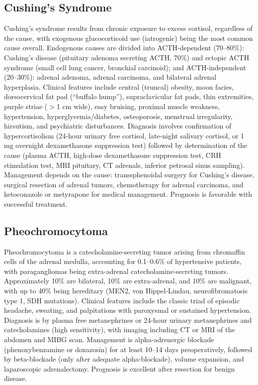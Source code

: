 \subsection{Cushing's Syndrome}
\label{sec:Cushing's Syndrome}
Cushing's syndrome results from chronic exposure to excess cortisol, regardless of the cause, with exogenous glucocorticoid use (iatrogenic) being the most common cause overall. Endogenous causes are divided into ACTH-dependent (70--80\%): Cushing's disease (pituitary adenoma secreting ACTH, 70\%) and ectopic ACTH syndrome (small cell lung cancer, bronchial carcinoid); and ACTH-independent (20--30\%): adrenal adenoma, adrenal carcinoma, and bilateral adrenal hyperplasia. Clinical features include central (truncal) obesity, moon facies, dorsocervical fat pad (``buffalo hump''), supraclavicular fat pads, thin extremities, purple striae ($>$1 cm wide), easy bruising, proximal muscle weakness, hypertension, hyperglycemia/diabetes, osteoporosis, menstrual irregularity, hirsutism, and psychiatric disturbances. Diagnosis involves confirmation of hypercortisolism (24-hour urinary free cortisol, late-night salivary cortisol, or 1 mg overnight dexamethasone suppression test) followed by determination of the cause (plasma ACTH, high-dose dexamethasone suppression test, CRH stimulation test, MRI pituitary, CT adrenals, inferior petrosal sinus sampling). Management depends on the cause: transsphenoidal surgery for Cushing's disease, surgical resection of adrenal tumors, chemotherapy for adrenal carcinoma, and ketoconazole or metyrapone for medical management. Prognosis is favorable with successful treatment.

\subsection{Pheochromocytoma}
\label{sec:Pheochromocytoma}
Pheochromocytoma is a catecholamine-secreting tumor arising from chromaffin cells of the adrenal medulla, accounting for 0.1--0.6\% of hypertensive patients, with paragangliomas being extra-adrenal catecholamine-secreting tumors. Approximately 10\% are bilateral, 10\% are extra-adrenal, and 10\% are malignant, with up to 40\% being hereditary (MEN2, von Hippel-Lindau, neurofibromatosis type 1, SDH mutations). Clinical features include the classic triad of episodic headache, sweating, and palpitations with paroxysmal or sustained hypertension. Diagnosis is by plasma free metanephrines or 24-hour urinary metanephrines and catecholamines (high sensitivity), with imaging including CT or MRI of the abdomen and MIBG scan. Management is alpha-adrenergic blockade (phenoxybenzamine or doxazosin) for at least 10--14 days preoperatively, followed by beta-blockade (only after adequate alpha-blockade), volume expansion, and laparoscopic adrenalectomy. Prognosis is excellent after resection for benign disease.

